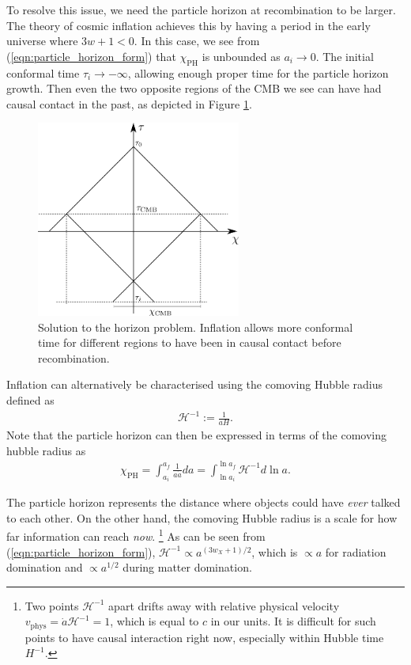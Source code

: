 To resolve this issue, we need the particle horizon at recombination to be larger. The theory of cosmic inflation achieves this by having a period in the early universe where $3w+1<0$. In this case, we see from (\ref{eqn:particle_horizon_form}) that $\chi_\text{PH}$ is unbounded as $a_i \rightarrow 0$. The initial conformal time $\tau_i \rightarrow -\infty$, allowing enough proper time for the particle horizon growth. Then even the two opposite regions of the CMB we see can have had causal contact in the past, as depicted in Figure \ref{fig:horizon_solution}.
\begin{figure}[htbp!] 
	\centering    
	\includegraphics[width=0.6\textwidth]{horizon_solution.png}
	\caption{Solution to the horizon problem. Inflation allows more conformal time for different regions to have been in causal contact before recombination.}
	\label{fig:horizon_solution}
\end{figure}

Inflation can alternatively be characterised using the comoving Hubble radius defined as
\begin{align}
	\mathcal{H}^{-1} := \frac{1}{aH}.
\end{align}
Note that the particle horizon can then be expressed in terms of the comoving hubble radius as
\begin{align}
	\chi_\text{PH} = \int_{a_i}^{a_f} \frac{1}{a \dot{a}} da = \int_{\ln a_i}^{\ln a_f} \mathcal{H}^{-1} d\ln a. \label{eqn:particle_horizon_comoving_hubble}
\end{align}

The particle horizon represents the distance where objects could have \textit{ever} talked to each other. On the other hand, the comoving Hubble radius is a scale for how far information can reach \textit{now}. \footnote{Two points $\mathcal{H}^{-1}$ apart drifts away with relative physical velocity $v_\text{phys} = \dot{a} \mathcal{H}^{-1} = 1$, which is equal to $c$ in our units. It is difficult for such points to have causal interaction right now, especially within Hubble time $H^{-1}$.} As can be seen from (\ref{eqn:particle_horizon_form}), $\mathcal{H}^{-1} \propto a^{(3w_X+1)/2}$, which is $\propto a$ for radiation domination and $\propto a^{1/2}$ during matter domination.

